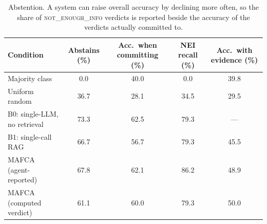 \begin{table}[t]
\centering
\caption{Abstention. A system can raise overall accuracy by declining more often, so the share of \textsc{not\_enough\_info} verdicts is reported beside the accuracy of the verdicts actually committed to.}
\label{tab:cond:abstain}
\small
\begin{tabular}{@{}lcccc@{}}
\toprule
Condition & Abstains (\%) & Acc.\ when committing (\%) & NEI recall (\%) & Acc.\ with evidence (\%) \\
\midrule
Majority class & 0.0 & 40.0 & 0.0 & 39.8 \\
Uniform random & 36.7 & 28.1 & 34.5 & 29.5 \\
B0: single-LLM, no retrieval & 73.3 & 62.5 & 79.3 & --- \\
B1: single-call RAG & 66.7 & 56.7 & 79.3 & 45.5 \\
MAFCA (agent-reported) & 67.8 & 62.1 & 86.2 & 48.9 \\
MAFCA (computed verdict) & 61.1 & 60.0 & 79.3 & 50.0 \\
\bottomrule
\end{tabular}
\end{table}
